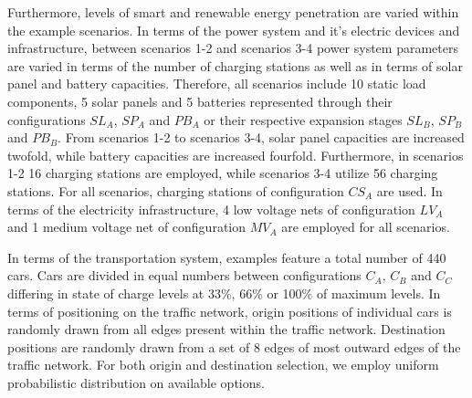 Furthermore, levels of smart and renewable energy penetration are varied within the example scenarios. In terms of the power system and it's electric devices and infrastructure, between scenarios 1-2 and scenarios 3-4 power system parameters are varied in terms of the number of charging stations as well as in terms of solar panel and battery capacities. Therefore, all scenarios include 10 static load components, 5 solar panels and 5 batteries represented through their configurations $SL_{A}$, $SP_{A}$ and $PB_{A}$ or their respective expansion stages $SL_{B}$, $SP_{B}$ and $PB_{B}$. From scenarios 1-2 to scenarios 3-4, solar panel capacities are increased twofold, while battery capacities are increased fourfold. Furthermore, in scenarios 1-2 16 charging stations are employed, while scenarios 3-4 utilize 56 charging stations. For all scenarios, charging stations of configuration $CS_{A}$ are used. In terms of the electricity infrastructure, 4 low voltage nets of configuration $LV_{A}$ and 1 medium voltage net of configuration $MV_{A}$ are employed for all scenarios. 


In terms of the transportation system, examples feature a total number of 440 cars. Cars are divided in equal numbers between configurations $C_{A}$, $C_{B}$ and $C_{C}$ differing in state of charge levels at 33\%, 66\% or 100\% of maximum levels. In terms of positioning on the traffic network, origin positions of individual cars is randomly drawn from all edges present within the traffic network. Destination positions are randomly drawn from a set of 8 edges of most outward edges of the traffic network. For both origin and destination selection, we employ uniform probabilistic distribution on available options. 


